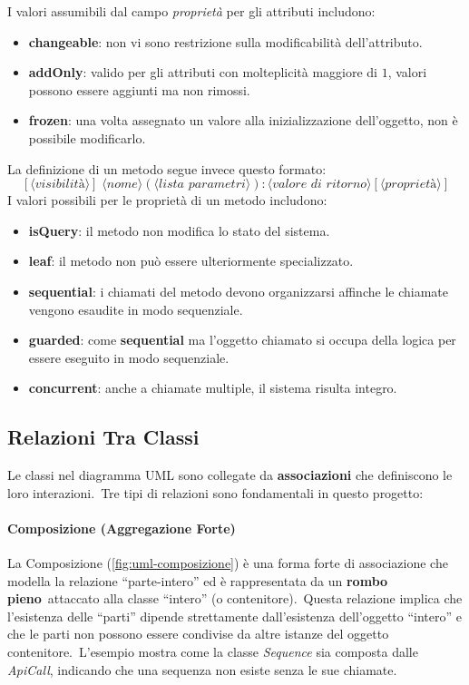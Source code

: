 I valori assumibili dal campo \textit{proprietà} per gli attributi includono:
\begin{itemize}
    \item \textbf{changeable}: non vi sono restrizione sulla modificabilità dell'attributo.
    \item \textbf{addOnly}: valido per gli attributi con molteplicità maggiore di $1$, valori possono essere aggiunti ma non rimossi.
    \item \textbf{frozen}: una volta assegnato un valore alla inizializzazione dell'oggetto, non è possibile modificarlo.
\end{itemize}

La definizione di un metodo segue invece questo formato:
\[
    [\langle \textit{visibilità} \rangle] \;
    \langle \textit{nome} \rangle
    (\langle \textit{lista parametri} \rangle)
    : \langle \textit{valore di ritorno} \rangle
    [\langle \textit{proprietà} \rangle]
\]
I valori possibili per le proprietà di un metodo includono:

\begin{itemize}
    \item \textbf{isQuery}: il metodo non modifica lo stato del sistema.
    \item \textbf{leaf}: il metodo non può essere ulteriormente specializzato.
    \item \textbf{sequential}: i chiamati del metodo devono organizzarsi affinche le chiamate vengono esaudite in modo sequenziale.
    \item \textbf{guarded}: come \textbf{sequential} ma l'oggetto chiamato si occupa della logica per essere eseguito in modo sequenziale.
    \item \textbf{concurrent}: anche a chiamate multiple, il sistema risulta integro.
\end{itemize}

\subsection{Relazioni Tra Classi}

Le classi nel diagramma UML sono collegate da \textbf{associazioni} che definiscono le loro interazioni.\
Tre tipi di relazioni sono fondamentali in questo progetto:

\paragraph{Composizione (Aggregazione Forte)}
La Composizione (\autoref{fig:uml-composizione}) è una forma forte di associazione che modella la relazione ``parte-intero'' ed è rappresentata da un \textbf{rombo pieno}\
attaccato alla classe ``intero'' (o contenitore).\
Questa relazione implica che l'esistenza delle ``parti'' dipende strettamente dall'esistenza dell'oggetto ``intero'' e che le parti non possono essere condivise da altre istanze del oggetto contenitore.\
L'esempio mostra come la classe \textit{Sequence} sia composta dalle \textit{ApiCall}, indicando che una sequenza non esiste senza le sue chiamate.

